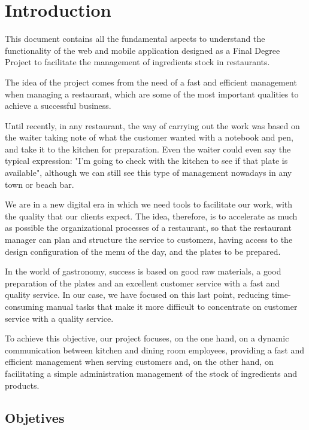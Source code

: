 \chapter*{Introduction}
\label{cap:introduction}

This document contains all the fundamental aspects to understand the functionality of the web and mobile application designed as a Final Degree Project to facilitate the management of ingredients stock in restaurants.

The idea of the project comes from the need of a fast and efficient management when managing a restaurant, which are some of the most important qualities to achieve a successful business.

Until recently, in any restaurant, the way of carrying out the work was based on the waiter taking note of what the customer wanted with a notebook and pen, and take it to the kitchen for preparation. Even the waiter could even say the typical expression: "I'm going to check with the kitchen to see if that plate is available", although we can still see this type of management nowadays in any town or beach bar.

We are in a new digital era in which we need tools to facilitate our work, with the quality that our clients expect. The idea, therefore, is to accelerate as much as possible the organizational processes of a restaurant, so that the restaurant manager can plan and structure the service to customers, having access to the design configuration of the menu of the day, and the plates to be prepared.

In the world of gastronomy, success is based on good raw materials, a good preparation of the plates and an excellent customer service with a fast and quality service. In our case, we have focused on this last point, reducing time-consuming manual tasks that make it more difficult to concentrate on customer service with a quality service.

To achieve this objective, our project focuses, on the one hand, on a dynamic communication between kitchen and dining room employees, providing a fast and efficient management when serving customers and, on the other hand, on facilitating a simple administration management of the stock of ingredients and products.


\section{Objetives}

